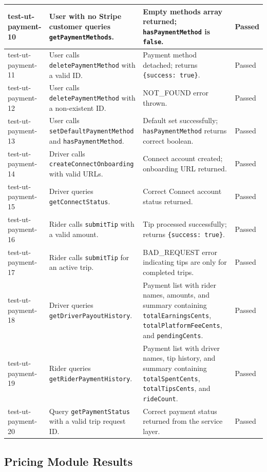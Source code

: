 \begin{longtable}{|p{}|>{\raggedright\arraybackslash}p{}|>{\raggedright\arraybackslash}p{}|p{}|}
\hline
test-ut-payment-10 & User with no Stripe customer queries \texttt{getPaymentMethods}. & Empty methods array returned; \texttt{hasPaymentMethod} is \texttt{false}. & Passed \\
\hline
test-ut-payment-11 & User calls \texttt{deletePaymentMethod} with a valid ID. & Payment method detached; returns \texttt{\{success: true\}}. & Passed \\
\hline
test-ut-payment-12 & User calls \texttt{deletePaymentMethod} with a non-existent ID. & NOT\_FOUND error thrown. & Passed \\
\hline
test-ut-payment-13 & User calls \texttt{setDefaultPaymentMethod} and \texttt{hasPaymentMethod}. & Default set successfully; \texttt{hasPaymentMethod} returns correct boolean. & Passed \\
\hline
test-ut-payment-14 & Driver calls \texttt{createConnectOnboarding} with valid URLs. & Connect account created; onboarding URL returned. & Passed \\
\hline
test-ut-payment-15 & Driver queries \texttt{getConnectStatus}. & Correct Connect account status returned. & Passed \\
\hline
test-ut-payment-16 & Rider calls \texttt{submitTip} with a valid amount. & Tip processed successfully; returns \texttt{\{success: true\}}. & Passed \\
\hline
test-ut-payment-17 & Rider calls \texttt{submitTip} for an active trip. & BAD\_REQUEST error indicating tips are only for completed trips. & Passed \\
\hline
test-ut-payment-18 & Driver queries \texttt{getDriverPayoutHistory}. & Payment list with rider names, amounts, and summary containing \texttt{totalEarningsCents}, \texttt{totalPlatformFeeCents}, and \texttt{pendingCents}. & Passed \\
\hline
test-ut-payment-19 & Rider queries \texttt{getRiderPaymentHistory}. & Payment list with driver names, tip history, and summary containing \texttt{totalSpentCents}, \texttt{totalTipsCents}, and \texttt{rideCount}. & Passed \\
\hline
test-ut-payment-20 & Query \texttt{getPaymentStatus} with a valid trip request ID. & Correct payment status returned from the service layer. & Passed \\
\hline
\end{longtable}

\subsection{Pricing Module Results}

